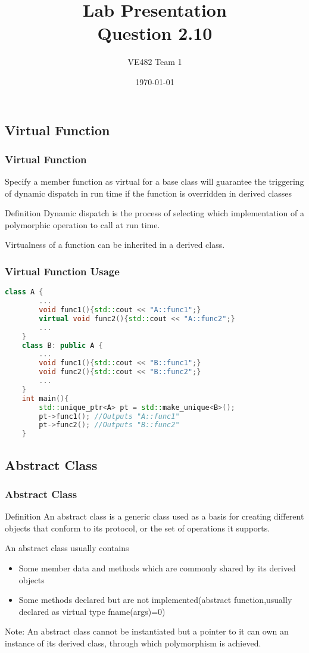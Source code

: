 \documentclass{beamer}
\title{Lab Presentation \\Question 2.10}
\author{VE482 Team 1}
\institute{UM-SJTU Joint Institute}
\date{\today}
\begin{document}
\begin{frame}
	\titlepage
\end{frame}

\begin{frame}
	\tableofcontents
\end{frame}


\begin{frame}
	\section{Virtual Function}
	\frametitle{Virtual Function}
	Specify a member function as {\color{blue} virtual} for a base class will guarantee the triggering of {\color{blue} dynamic dispatch} in run time if the function is overridden in derived classes
	\begin{block}{Definition}
		{\color{blue} Dynamic dispatch} is the process of selecting which implementation of a polymorphic operation to call at run time.
	\end{block}
	Virtualness of a function can be inherited in a derived class.
\end{frame}

\begin{frame}[fragile]
	\frametitle{Virtual Function Usage}
	\begin{lstlisting}[language=C++]
	class A {
	    ...
	    void func1(){std::cout << "A::func1";}
	    virtual void func2(){std::cout << "A::func2";}
	    ...
	}
	class B: public A {
	    ...
	    void func1(){std::cout << "B::func1";}
	    void func2(){std::cout << "B::func2";}
	    ...
	}
	int main(){
	    std::unique_ptr<A> pt = std::make_unique<B>();
	    pt->func1(); //Outputs "A::func1"
	    pt->func2(); //Outputs "B::func2"
	}
	\end{lstlisting}

	
\end{frame}

\begin{frame}
	\section{Abstract Class}
	\frametitle{Abstract Class}
	\begin{block}{Definition}
		An {\color{blue} abstract class} is a generic class used as a basis for creating different objects that conform to its protocol, or the set of operations it supports.
	\end{block}
	An abstract class usually contains 
	\begin{itemize}
		\item Some member data and methods which are commonly shared by its derived objects
		\item Some methods declared but are not implemented(abstract function,usually declared as {\color{blue} virtual type fname(args)=0}) 
	\end{itemize}
	{\color{blue} Note: }An abstract class cannot be instantiated but a pointer to it can own an instance of its derived class, through which polymorphism is achieved.
\end{frame}
\end{document}
